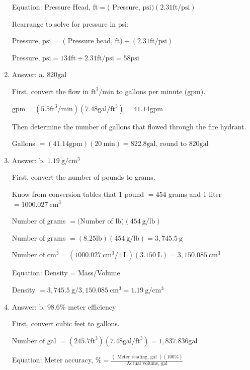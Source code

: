 \documentclass[10pt]{article}
\begin{document}
\begin{enumerate}
Equation: Pressure Head, $\mathrm{ft}=($ Pressure, $\mathrm{psi})(2.31 \mathrm{ft} / \mathrm{psi})$

Rearrange to solve for pressure in psi:

Pressure, psi $=($ Pressure head, $\mathrm{ft}) \div(2.31 \mathrm{ft} / \mathrm{psi})$

Pressure, $\mathrm{psi}=134 \mathrm{ft} \div 2.31 \mathrm{ft} / \mathrm{psi}=58 \mathrm{psi}$

  \item Answer: a. $820 \mathrm{gal}$

First, convert the flow in $\mathrm{ft}^{3} / \mathrm{min}$ to gallons per minute (gpm).

$\mathrm{gpm}=\left(5.5 \mathrm{ft}^{3} / \mathrm{min}\right)\left(7.48 \mathrm{gal} / \mathrm{ft}^{3}\right)=41.14 \mathrm{gpm}$

Then determine the number of gallons that flowed through the fire hydrant.

Gallons $=(41.14 \mathrm{gpm})(20 \mathrm{~min})=822.8 \mathrm{gal}$, round to $820 \mathrm{gal}$

  \item Answer: b. $1.19 \mathrm{~g} / \mathrm{cm}^{3}$

First, convert the number of pounds to grams.

Know from conversion tables that 1 pound $=454$ grams and 1 liter $=1000.027 \mathrm{~cm}^{3}$

Number of grams $=(\mathrm{Number}$ of $\mathrm{lb})(454 \mathrm{~g} / \mathrm{lb})$

Number of grams $=(8.25 \mathrm{lb})(454 \mathrm{~g} / \mathrm{lb})=3,745.5 \mathrm{~g}$

Number of $\mathrm{cm}^{3}=\left(1000.027 \mathrm{~cm}^{3} / 1 \mathrm{~L}\right)(3.150 \mathrm{~L})=3,150.085 \mathrm{~cm}^{3}$

Equation: Density = Mass/Volume

Density $=3,745.5 \mathrm{~g} / 3,150.085 \mathrm{~cm}^{3}=1.19 \mathrm{~g} / \mathrm{cm}^{3}$

  \item Answer: b. $98.6 \%$ meter efficiency

First, convert cubic feet to gallons.

Number of gal $=\left(245.7 \mathrm{ft}^{3}\right)\left(7.48 \mathrm{gal} / \mathrm{ft}^{3}\right)=1,837.836 \mathrm{gal}$

Equation: Meter accuracy, $\%=\frac{(\text { Meter reading, gal })(100 \%)}{\text { Actual volume, gal }}$


\end{enumerate}
\end{document}
